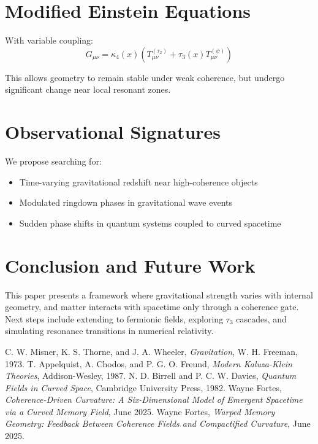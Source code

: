 \documentclass[12pt]{article}
\begin{document}
\section{Modified Einstein Equations}
With variable coupling:
\[
G_{\mu\nu} = \kappa_4(x) \left( T_{\mu\nu}^{(\tau_2)} + \tau_3(x) T_{\mu\nu}^{(\psi)} \right)
\]

This allows geometry to remain stable under weak coherence, but undergo significant change near local resonant zones.

\section{Observational Signatures}
We propose searching for:
\begin{itemize}
\item Time-varying gravitational redshift near high-coherence objects
\item Modulated ringdown phases in gravitational wave events
\item Sudden phase shifts in quantum systems coupled to curved spacetime
\end{itemize}

\section{Conclusion and Future Work}
This paper presents a framework where gravitational strength varies with internal geometry, and matter interacts with spacetime only through a coherence gate. Next steps include extending to fermionic fields, exploring $\tau_3$ cascades, and simulating resonance transitions in numerical relativity.

\begin{thebibliography}{9}
 C. W. Misner, K. S. Thorne, and J. A. Wheeler, \textit{Gravitation}, W. H. Freeman, 1973.
 T. Appelquist, A. Chodos, and P. G. O. Freund, \textit{Modern Kaluza-Klein Theories}, Addison-Wesley, 1987.
 N. D. Birrell and P. C. W. Davies, \textit{Quantum Fields in Curved Space}, Cambridge University Press, 1982.
 Wayne Fortes, \textit{Coherence-Driven Curvature: A Six-Dimensional Model of Emergent Spacetime via a Curved Memory Field}, June 2025.
 Wayne Fortes, \textit{Warped Memory Geometry: Feedback Between Coherence Fields and Compactified Curvature}, June 2025.
\end{thebibliography}
\end{document}
